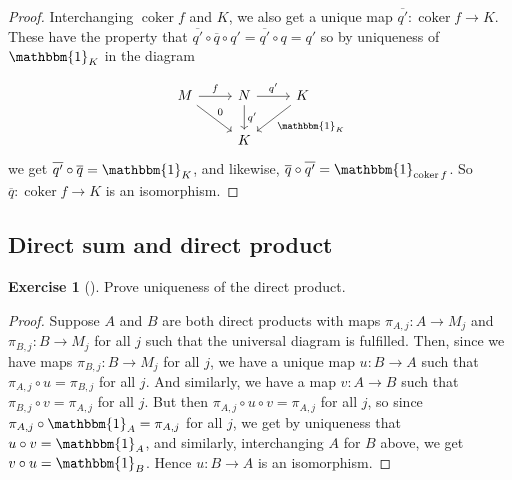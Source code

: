 \documentclass[reqno]{amsart}
\theoremstyle{definition}
\newtheorem{exercise}[theorem]{Exercise}
\theoremstyle{remark}
\DeclareMathOperator{\coker}{coker}
\begin{document}
\begin{proof}
        Interchanging $\coker f$ and 
        $K$, we also get a unique map
        $\overline{q'} \colon \coker f \to K$. These
        have the property that
        $ \overline{q'} \circ \overline{q} \circ q'
        = \overline{q'} \circ q = q'$ so
        by uniqueness of $\mathbbm{1}_K$ in the diagram
        
        \begin{equation*}
        \begin{tikzcd}
            M \ar[r, "f"] \ar[dr, "0"] & N \ar[r, "q'"]
            \ar[d, "q'"]& K \ar[dl, 
            "\mathbbm{1}_K"] \\
                          & K &
        \end{tikzcd}
        \end{equation*}
        we get 
        $\overline{q'} \circ \overline{q} = \mathbbm{1}_K$, and
        likewise, $\overline{q} \circ \overline{q'} = 
        \mathbbm{1}_{\coker f}$. So
        $\overline{q} \colon \coker f \to K$ is
        an isomorphism.

        
    \end{proof}


\subsection{Direct sum and direct product}

    \begin{exercise}[]
        Prove uniqueness of the direct product.
    \end{exercise}

    \begin{proof}
        Suppose
        $A$ and $B$ are both direct products
        with maps $\pi_{A,j} \colon A \to M_j$ and
        $\pi_{B,j} \colon B \to M_j$ for all $j$ such
        that the universal diagram is fulfilled.
        Then, since we have
        maps $\pi_{B,j} \colon B \to M_j$ for all $j$, we
        have a unique map
        $u \colon B \to A$ such that
        $\pi_{A,j} \circ u = \pi_{B,j}$ for all $j$. And
        similarly, we have a map
        $v \colon A \to B$ such that
        $\pi_{B,j} \circ v = \pi_{A,j}$ for all $j$.
        But then
        $\pi_{A,j} \circ u \circ v = \pi_{A,j}$ for all
        $j$, so since $\pi_{A,j} \circ \mathbbm{1}_{A}
        = \pi_{A,j}$ for all $j$, we get by uniqueness
        that $u \circ v = \mathbbm{1}_A$, and similarly,
        interchanging  $A$ for $B$ above, we get
        $v \circ u = \mathbbm{1}_B$. Hence
        $u \colon B \to A$ is an isomorphism.


        


    \end{proof}
\end{document}
